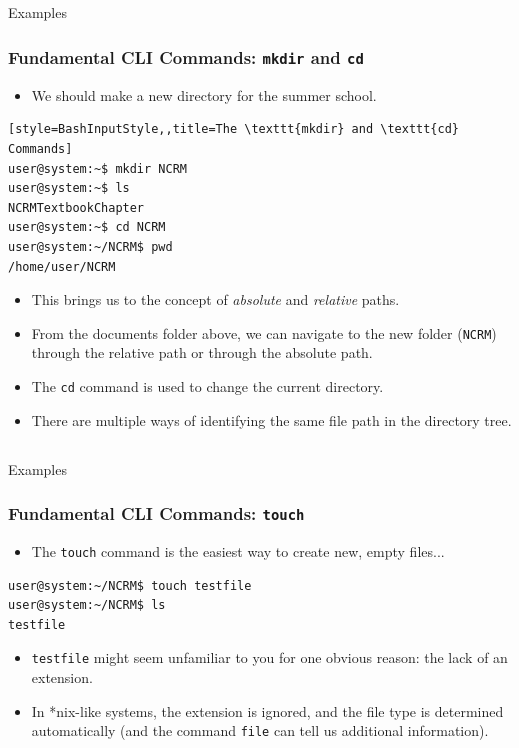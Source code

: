 \documentclass[10pt]{beamer}
\begin{document}
\subsection{}
\begin{frame}[fragile]{Examples}
\frametitle{Fundamental CLI Commands: \texttt{mkdir} and \texttt{cd}}
\begin{itemize}
\item We should make a new directory for the summer school. \vspace{0.05in}
\end{itemize}
\begin{lstlisting}[style=BashInputStyle,,title=The \texttt{mkdir} and \texttt{cd} Commands]
user@system:~$ mkdir NCRM
user@system:~$ ls
NCRMTextbookChapter
user@system:~$ cd NCRM
user@system:~/NCRM$ pwd
/home/user/NCRM
\end{lstlisting}
\vspace{0.1in}
\begin{itemize} 
\item This brings us to the concept of \emph{absolute} and \emph{relative} paths. \vspace{0.05in}
\item From the documents folder above, we can navigate to the new folder (\texttt{NCRM}) through the relative path or through the absolute path. \vspace{0.05in}
\item The \texttt{cd} command is used to change the current directory.\vspace{0.05in}
\item There are multiple ways of identifying the same file path in the directory tree.
\end{itemize}
\end{frame}

\subsection{}
\begin{frame}[fragile]{Examples}
\frametitle{Fundamental CLI Commands: \texttt{touch}}
\begin{itemize}
\item The \texttt{touch} command is the easiest way to create new, empty files...
\end{itemize}
\begin{lstlisting}[style=BashInputStyle,title=The \texttt{touch} Command]
user@system:~/NCRM$ touch testfile
user@system:~/NCRM$ ls
testfile
\end{lstlisting}
\vspace{0.1in}
\begin{itemize}
\item \texttt{testfile} might seem unfamiliar to you for one obvious reason: the lack of an extension. \vspace{0.1in}
\item  In *nix-like systems, the extension is ignored, and the file type is determined automatically (and the command \texttt{file} can tell us additional information).\vspace{0.1in}
\end{itemize}
\end{frame}
\end{document}
